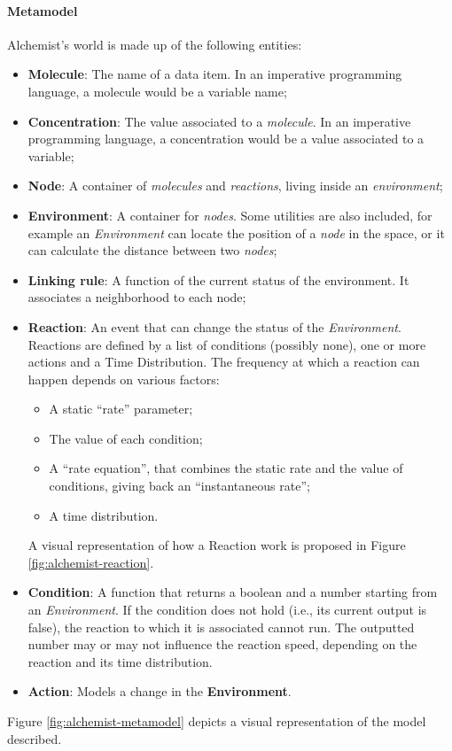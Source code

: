 \paragraph{Metamodel} Alchemist's world is made up of the following entities:
\begin{itemize}
	\item \textbf{Molecule}: The name of a data item. In an imperative programming language, a molecule would be a variable name;
	\item \textbf{Concentration}: The value associated to a \textit{molecule}. In an imperative programming language, a concentration would be a value associated to a variable;
	\item \textbf{Node}: A container of \textit{molecules} and \textit{reactions}, living inside an \textit{environment};
	\item \textbf{Environment}: A container for \textit{nodes}. Some utilities are also included, for example an \textit{Environment} can locate the position of a \textit{node} in the space, or it can calculate the distance between two \textit{nodes};
	\item \textbf{Linking rule}: A function of the current status of the environment. It associates a neighborhood to each node;
	\item \textbf{Reaction}: An event that can change the status of the \textit{Environment}. Reactions are defined by a list of conditions (possibly none), one or more actions and  a Time Distribution. The frequency at which a reaction can happen depends on various factors:
	\begin{itemize}
		\item A static “rate” parameter;
		\item The value of each condition;
		\item A “rate equation”, that combines the static rate and the value of conditions, giving back an “instantaneous rate”;
		\item A time distribution.
	\end{itemize}
	A visual representation of how a Reaction work is proposed in Figure \ref{fig:alchemist-reaction}.
	\item \textbf{Condition}: A function that returns a boolean and a number starting from an \textit{Environment}. If the condition does not hold (i.e., its current output is false), the reaction to which it is associated cannot run.
	The outputted number may or may not influence the reaction speed, depending on the reaction and its time distribution.
	\item \textbf{Action}: Models a change in the \textbf{Environment}.
\end{itemize}
Figure \ref{fig:alchemist-metamodel} depicts a visual representation of the model described.

